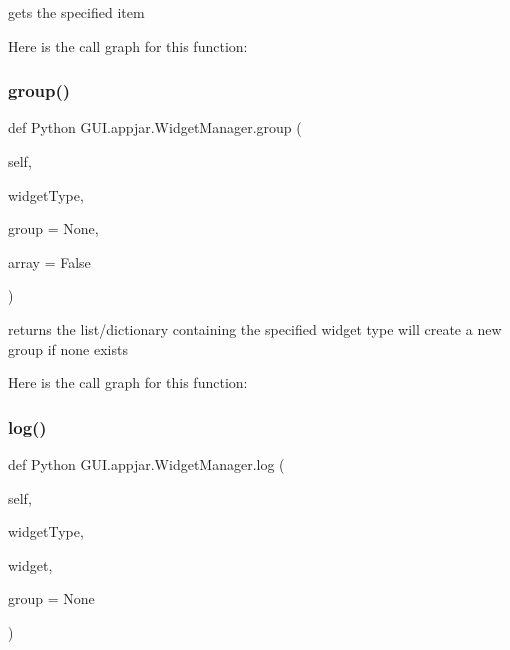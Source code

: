 \begin{DoxyVerb}gets the specified item \end{DoxyVerb}
 Here is the call graph for this function\+:
\mbox{\label{class_python_01_g_u_i_1_1appjar_1_1_widget_manager_a6fa4043a5945618a9ded50173f06599d}} 
\subsubsection{\texorpdfstring{group()}{group()}}
{\footnotesize\ttfamily def Python G\+U\+I.\+appjar.\+Widget\+Manager.\+group (\begin{DoxyParamCaption}\item[{}]{self,  }\item[{}]{widget\+Type,  }\item[{}]{group = {\ttfamily None},  }\item[{}]{array = {\ttfamily False} }\end{DoxyParamCaption})}

\begin{DoxyVerb}returns the list/dictionary containing the specified widget type
will create a new group if none exists
\end{DoxyVerb}
 Here is the call graph for this function\+:
\mbox{\label{class_python_01_g_u_i_1_1appjar_1_1_widget_manager_a0fed8387800a09e64d62a47819da54af}} 
\subsubsection{\texorpdfstring{log()}{log()}}
{\footnotesize\ttfamily def Python G\+U\+I.\+appjar.\+Widget\+Manager.\+log (\begin{DoxyParamCaption}\item[{}]{self,  }\item[{}]{widget\+Type,  }\item[{}]{widget,  }\item[{}]{group = {\ttfamily None} }\end{DoxyParamCaption})}

